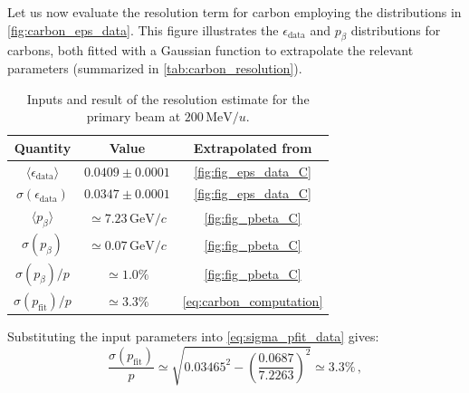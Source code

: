 Let us now evaluate the resolution term for carbon employing the distributions in \autoref{fig:carbon_eps_data}. This figure illustrates the $\epsilon_\text{data}$ and $p_\beta$ distributions for carbons, both fitted with a Gaussian function to extrapolate the relevant parameters (summarized in \autoref{tab:carbon_resolution}).
\begin{table}[H]
	\centering
	\renewcommand{\arraystretch}{1.0}
	\begin{tabular}{ccc}
		\toprule
		\textbf{Quantity} & \textbf{Value} & \textbf{Extrapolated from} \\
		\midrule
		$\langle\epsilon_\text{data}\rangle$ & $0.0409\pm0.0001$ & \autoref{fig:fig_eps_data_C}\\
		$\sigma(\epsilon_\text{data})$ & $0.0347\pm0.0001$ & \autoref{fig:fig_eps_data_C}\\
		$\langle p_\beta\rangle$ & $\simeq7.23\,\mathrm{GeV}/c$ & \autoref{fig:fig_pbeta_C} \\
		$\sigma(p_\beta)$ & $\simeq0.07\,\mathrm{GeV}/c$ & \autoref{fig:fig_pbeta_C} \\
		$\sigma(p_\beta)/p$ & $\simeq1.0\%$ & \autoref{fig:fig_pbeta_C} \\
		$\sigma(p_\text{fit})/p$ & $\simeq3.3\%$ & \autoref{eq:carbon_computation} \\
		\bottomrule
	\end{tabular}
	\caption[Momentum resolution for $200\,\mathrm{MeV}/u$ ]{Inputs and result of the resolution estimate for the primary  beam at $200\,\mathrm{MeV}/u$.}
	\label{tab:carbon_resolution}
\end{table}\noindent
Substituting the input parameters into \autoref{eq:sigma_pfit_data} gives:
\begin{equation}
	\frac{\sigma(p_\text{fit})}{p}\simeq\sqrt{0.03465^2-\left(\frac{0.0687}{7.2263}\right)^2}\simeq3.3\%\,,
	\label{eq:carbon_computation}
\end{equation}
